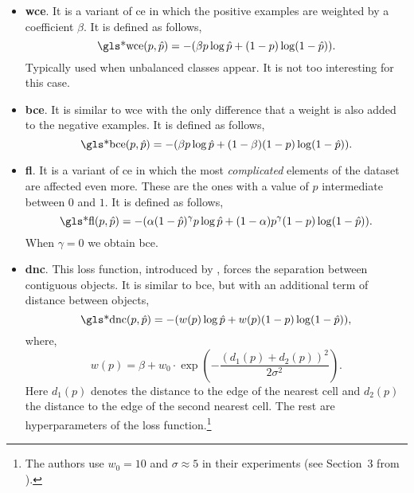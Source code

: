 \begin{itemize}
  \item \textbf{\gls*{wce}}. It is a variant of \gls{ce} in which the positive
  examples are weighted by a coefficient \(\beta\). It is defined as follows,
  \begin{equation}
    \text{\gls*{wce}}(p, \hat{p}) =
    -(\beta p\log\hat{p} + (1 - p)\log(1 - \hat{p})).
  \end{equation}
  Typically used when unbalanced classes appear. It is not too interesting for
  this case.
  \item \textbf{\gls*{bce}}. It is similar to \gls{wce} with the only
  difference that a weight is also added to the negative examples. It is
  defined as follows,
  \begin{equation}
    \text{\gls*{bce}}(p, \hat{p}) =
    -(\beta p\log\hat{p} + (1 - \beta)(1 - p)\log(1 - \hat{p})).
  \end{equation}
  \item \textbf{\gls*{fl}}. It is a variant of \gls{ce} in which the most
  \emph{complicated} elements of the dataset are affected even more. These are
  the ones with a value of \(\hat{p}\) intermediate between \(0\) and \(1\). It
  is defined as follows,
  \begin{equation}
    \text{\gls*{fl}}(p, \hat{p}) =
    -(\alpha (1 - \hat{p})^\gamma p\log\hat{p} +
    (1 - \alpha)p^\gamma (1 - p)\log(1 - \hat{p})).
  \end{equation}
  When \(\gamma = 0\) we obtain \gls{bce}.
  \item \textbf{\gls*{dnc}}. This loss function, introduced by
  , forces the separation between contiguous
  objects. It is similar to \gls{bce}, but with an additional term of distance
  between objects,
  \begin{equation}
    \text{\gls*{dnc}}(p, \hat{p}) =
    -(w(p)\log\hat{p} + w(p)(1 - p)\log(1 - \hat{p})),
  \end{equation}
  where,
  \begin{equation}
    w(p) = \beta +
    w_0 \cdot \exp\left(-\frac{(d_1(p) + d_2(p))^2}{2\sigma^2}\right).
  \end{equation}
  Here \(d_1(p)\) denotes the distance to the edge of the nearest cell and
  \(d_2(p)\) the distance to the edge of the second nearest cell. The rest are
  hyperparameters of the loss function.\footnote{The authors use \(w_0 = 10\)
    and \(\sigma \approx 5\) in their experiments (see Section~3 from
    \cite{ronneberger15:u}).}
\end{itemize}


